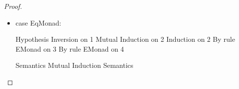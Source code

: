 \begin{proof}
\begin{itemize}
Suppose it is $\iota_2(v_B)$. Then,
$\interpE{\judgeE{\Gamma}{\Case{e}{x}{[\inl{x}/z]e'}{y}{[\inr{y}/z]e'}}{C}}\;\theta\;\gamma$
is equal to
\begin{eqnproof}
        {Semantics}
        {Sums}  
        {Substitution}
        {Semantics}
        {Since $x \not \in FV(e')$}
        {Meaning of $\iota_2(v_B)$}
        {Substitution}
\end{eqnproof}

\item case EqMonad:

  \begin{eqnproof}
             {Hypothesis}
             {Inversion on 1}
             {Mutual Induction on 2}
             {Induction on 2}
             {By rule EMonad on 3}
             {By rule EMonad on 4}
  \end{eqnproof}

  \begin{eqnproof}
          {Semantics}
          {Mutual Induction}
          {Semantics}
  \end{eqnproof}


\end{itemize}
\end{proof}
